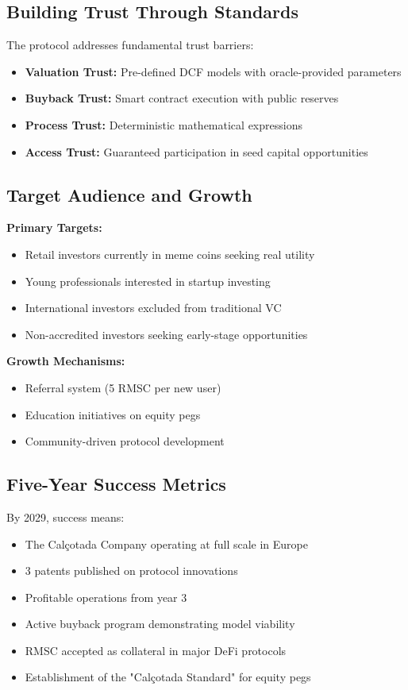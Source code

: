 \documentclass[conference]{IEEEtran}
\begin{document}
\subsection{Building Trust Through Standards}

The protocol addresses fundamental trust barriers:
\begin{itemize}
    \item \textbf{Valuation Trust:} Pre-defined DCF models with oracle-provided parameters
    \item \textbf{Buyback Trust:} Smart contract execution with public reserves
    \item \textbf{Process Trust:} Deterministic mathematical expressions
    \item \textbf{Access Trust:} Guaranteed participation in seed capital opportunities
\end{itemize}

\subsection{Target Audience and Growth}

\textbf{Primary Targets:}
\begin{itemize}
    \item Retail investors currently in meme coins seeking real utility
    \item Young professionals interested in startup investing
    \item International investors excluded from traditional VC
    \item Non-accredited investors seeking early-stage opportunities
\end{itemize}

\textbf{Growth Mechanisms:}
\begin{itemize}
    \item Referral system (5 RMSC per new user)
    \item Education initiatives on equity pegs
    \item Community-driven protocol development
\end{itemize}

\subsection{Five-Year Success Metrics}

By 2029, success means:
\begin{itemize}
    \item The Calçotada Company operating at full scale in Europe
    \item 3 patents published on protocol innovations
    \item Profitable operations from year 3
    \item Active buyback program demonstrating model viability
    \item RMSC accepted as collateral in major DeFi protocols
    \item Establishment of the "Calçotada Standard" for equity pegs
\end{itemize}
\end{document}

